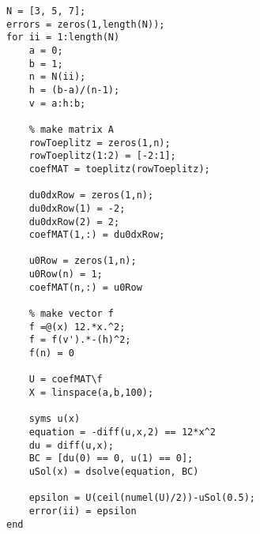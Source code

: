 \documentclass[11pt]{article}
\begin{document}
\begin{lstlisting}
N = [3, 5, 7];
errors = zeros(1,length(N));
for ii = 1:length(N)
    a = 0;
    b = 1;
    n = N(ii);
    h = (b-a)/(n-1);
    v = a:h:b;

    % make matrix A
    rowToeplitz = zeros(1,n);
    rowToeplitz(1:2) = [-2:1];
    coefMAT = toeplitz(rowToeplitz);

    du0dxRow = zeros(1,n);
    du0dxRow(1) = -2;
    du0dxRow(2) = 2;
    coefMAT(1,:) = du0dxRow;

    u0Row = zeros(1,n);
    u0Row(n) = 1;
    coefMAT(n,:) = u0Row

    % make vector f
    f =@(x) 12.*x.^2;
    f = f(v').*-(h)^2;
    f(n) = 0

    U = coefMAT\f
    X = linspace(a,b,100);

    syms u(x)
    equation = -diff(u,x,2) == 12*x^2
    du = diff(u,x);
    BC = [du(0) == 0, u(1) == 0];
    uSol(x) = dsolve(equation, BC)
    
    epsilon = U(ceil(numel(U)/2))-uSol(0.5);
    error(ii) = epsilon  
end
\end{lstlisting}
\end{document}
